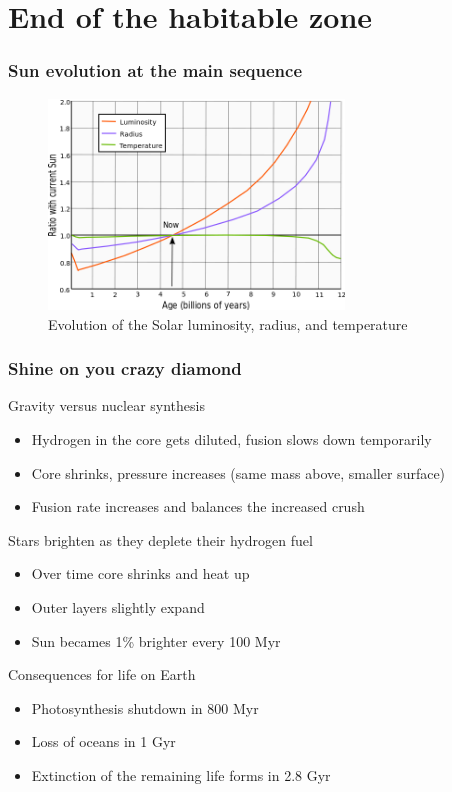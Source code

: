 \documentclass[aspectratio=169]{beamer}
\begin{document}
\section{End of the habitable zone}
\begin{frame}
\frametitle{Sun evolution at the main sequence}
\begin{figure}
\includegraphics[width=0.7\textwidth]{img/640px-Solar_evolution_(English).png}
\captionsetup{labelformat=empty}
\caption{Evolution of the Solar luminosity, radius, and temperature \cite{arXiv:0911.4872}}
\end{figure}
\end{frame}

\begin{frame}
\frametitle{Shine on you crazy diamond}
\begin{block}{Gravity versus nuclear synthesis}
\begin{itemize}
\item Hydrogen in the core gets diluted, fusion slows down temporarily
\item Core shrinks, pressure increases (same mass above, smaller surface)
\item Fusion rate increases and balances the increased crush
\end{itemize}
\end{block}
\begin{block}{Stars brighten as they deplete their hydrogen fuel}
\begin{itemize}
\item Over time core shrinks and heat up
\item Outer layers slightly expand
\item Sun becames 1\% brighter every 100 Myr
\end{itemize}
\end{block}

\begin{block}{Consequences for life on Earth}
\begin{itemize}
\item{Photosynthesis shutdown in 800 Myr}
\item{Loss of oceans in 1 Gyr}
\item{Extinction of the remaining life forms in 2.8 Gyr}
\end{itemize}
\end{block}
\end{frame}
\end{document}

